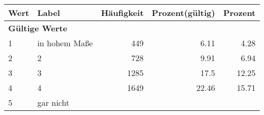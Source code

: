      \begin{longtable}{lXrrr}
     \toprule
     \textbf{Wert} & \textbf{Label} & \textbf{Häufigkeit} & \textbf{Prozent(gültig)} & \textbf{Prozent} \\
     \endhead
     \midrule
     \multicolumn{5}{l}{\textbf{Gültige Werte}}\\

     1 &
     \multicolumn{1}{X}{ in hohem Maße   } &


       \num{449} &
       \num[round-mode=places,round-precision=2]{6.11} &
         \num[round-mode=places,round-precision=2]{4.28} \\

     2 &
     \multicolumn{1}{X}{ 2   } &


       \num{728} &
       \num[round-mode=places,round-precision=2]{9.91} &
         \num[round-mode=places,round-precision=2]{6.94} \\

     3 &
     \multicolumn{1}{X}{ 3   } &


       \num{1285} &
       \num[round-mode=places,round-precision=2]{17.5} &
         \num[round-mode=places,round-precision=2]{12.25} \\

     4 &
     \multicolumn{1}{X}{ 4   } &


       \num{1649} &
       \num[round-mode=places,round-precision=2]{22.46} &
         \num[round-mode=places,round-precision=2]{15.71} \\

     5 &
     \multicolumn{1}{X}{ gar nicht   } &



\end{longtable}
